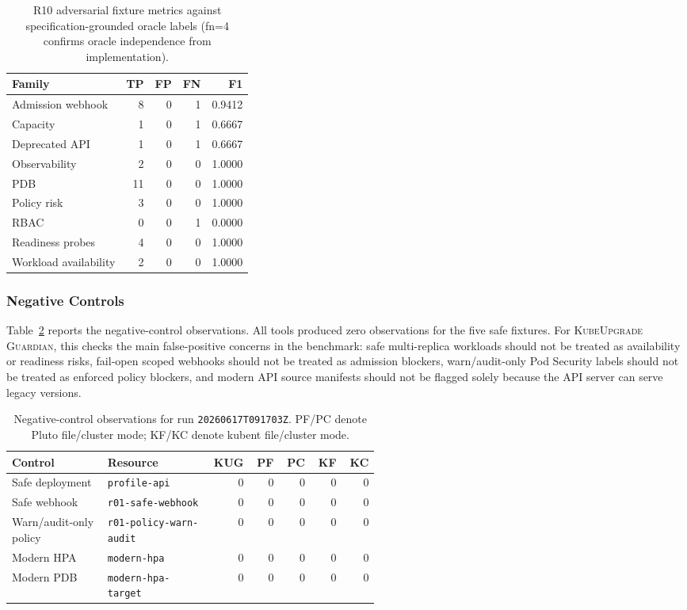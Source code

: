 \documentclass[10pt,journal]{IEEEtran}
\newcommand{\tool}{\textsc{KubeUpgrade Guardian}}
\newcommand{\code}[1]{\texttt{#1}}
\begin{document}
\begin{table}[t]
  \centering
  \caption{R10 adversarial fixture metrics against specification-grounded oracle labels (fn=4 confirms oracle independence from implementation).}
  \label{tab:r10-family}
  \scriptsize
  \begin{tabular}{lrrrr}
    \toprule
    Family & TP & FP & FN & F1 \\
    \midrule
    Admission webhook & 8 & 0 & 1 & 0.9412 \\
    Capacity & 1 & 0 & 1 & 0.6667 \\
    Deprecated API & 1 & 0 & 1 & 0.6667 \\
    Observability & 2 & 0 & 0 & 1.0000 \\
    PDB & 11 & 0 & 0 & 1.0000 \\
    Policy risk & 3 & 0 & 0 & 1.0000 \\
    RBAC & 0 & 0 & 1 & 0.0000 \\
    Readiness probes & 4 & 0 & 0 & 1.0000 \\
    Workload availability & 2 & 0 & 0 & 1.0000 \\
    \bottomrule
  \end{tabular}
\end{table}

\subsubsection*{Negative Controls}
Table~\ref{tab:negative-controls} reports the negative-control observations. All tools produced zero observations for the five safe fixtures. For \tool{}, this checks the main false-positive concerns in the benchmark: safe multi-replica workloads should not be treated as availability or readiness risks, fail-open scoped webhooks should not be treated as admission blockers, warn/audit-only Pod Security labels should not be treated as enforced policy blockers, and modern API source manifests should not be flagged solely because the API server can serve legacy versions.

\begin{table}[t]
  \centering
  \caption{Negative-control observations for run \code{20260617T091703Z}. PF/PC denote Pluto file/cluster mode; KF/KC denote kubent file/cluster mode.}
  \label{tab:negative-controls}
  \scriptsize
  \begin{tabular}{p{0.26\linewidth}p{0.28\linewidth}rrrrr}
    \toprule
    Control & Resource & KUG & PF & PC & KF & KC \\
    \midrule
    Safe deployment & \code{profile-api} & 0 & 0 & 0 & 0 & 0 \\
    Safe webhook & \code{r01-safe-webhook} & 0 & 0 & 0 & 0 & 0 \\
    Warn/audit-only policy & \code{r01-policy-warn-audit} & 0 & 0 & 0 & 0 & 0 \\
    Modern HPA & \code{modern-hpa} & 0 & 0 & 0 & 0 & 0 \\
    Modern PDB & \code{modern-hpa-target} & 0 & 0 & 0 & 0 & 0 \\
    \bottomrule
  \end{tabular}
\end{table}
\end{document}
